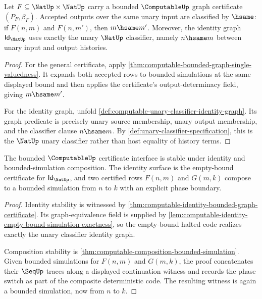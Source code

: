 \begin{theorem}
\label{thm:computable-classifier-obligation}
Let $F\subseteq\NatUp\times\NatUp$ carry a bounded $\ComputableUp$ graph certificate $(P_F,\beta_F)$. Accepted outputs over the same unary input are classified by $\hsame$: if $F(n,m)$ and $F(n,m')$, then $m\hsame m'$. Moreover, the identity graph $\mathsf{Id}_{\NatUp}$ uses exactly the unary $\NatUp$ classifier, namely $n\hsame m$ between unary input and output histories.
\end{theorem}
\begin{proof}
For the general certificate, apply \autoref{thm:computable-bounded-graph-single-valuedness}. It expands both accepted rows to bounded simulations at the same displayed bound and then applies the certificate's output-determinacy field, giving $m\hsame m'$.

For the identity graph, unfold \autoref{def:computable-unary-classifier-identity-graph}. Its graph predicate is precisely unary source membership, unary output membership, and the classifier clause $n\hsame m$. By \autoref{def:unary-classifier-specification}, this is the $\NatUp$ unary classifier rather than host equality of history terms.
\end{proof}

\begin{theorem}
\label{thm:computable-stability-obligation}
The bounded $\ComputableUp$ certificate interface is stable under identity and bounded-simulation composition. The identity surface is the empty-bound certificate for $\mathsf{Id}_{\NatUp}$, and two certified rows $F(n,m)$ and $G(m,k)$ compose to a bounded simulation from $n$ to $k$ with an explicit phase boundary.
\end{theorem}
\begin{proof}
Identity stability is witnessed by \autoref{thm:computable-identity-bounded-graph-certificate}. Its graph-equivalence field is supplied by \autoref{lem:computable-identity-empty-bound-simulation-exactness}, so the empty-bound halted code realizes exactly the unary classifier identity graph.

Composition stability is \autoref{thm:computable-composition-bounded-simulation}. Given bounded simulations for $F(n,m)$ and $G(m,k)$, the proof concatenates their $\SeqUp$ traces along a displayed continuation witness and records the phase switch as part of the composite deterministic code. The resulting witness is again a bounded simulation, now from $n$ to $k$.
\end{proof}

